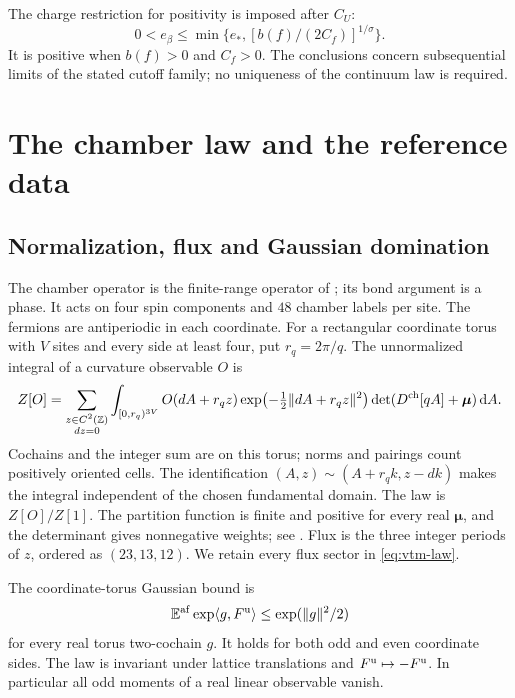 The charge restriction for positivity is imposed after $C_U$:
\begin{equation}\label{eq:constants-probe-charge}
 0<e_\beta\le
       \min\{e_*,[b(f)/(2C_f)]^{1/\sigma}\}.
\end{equation}
It is positive when $b(f)>0$ and $C_f>0$.
The conclusions concern subsequential limits of the stated
cutoff family; no uniqueness of the continuum law is required.

\section{The chamber law and the reference data}\label{sec:vtm-data}

\subsection{Normalization, flux and Gaussian domination}

The chamber operator is the finite-range operator of
\cite[\S2]{ChamberLattice}; its bond argument is a phase.
It acts on four spin components and $48$ chamber labels per
site. The fermions are antiperiodic in each coordinate.
For a rectangular coordinate torus with $V$ sites and every
side at least four, put $r_q=2\pi/q$. The unnormalized integral
of a curvature observable $O$ is
\begin{equation}\label{eq:vtm-law}
 Z[O]=\sum_{\substack{z\in C^2(\mathbb Z)\\dz=0}}
  \int_{[0,r_q)^{3V}}
 O(dA+r_qz)\exp\bigl(-\tfrac12\|dA+r_qz\|^2\bigr)
 \det(D^{\rm ch}[qA]+\boldsymbol\mu)\,\mathrm d A.
\end{equation}
Cochains and the integer sum are on this torus; norms and
pairings count positively oriented cells. The identification
$(A,z)\sim(A+r_qk,z-dk)$ makes the integral independent
of the chosen fundamental domain. The law is $Z[O]/Z[1]$.
The partition function is finite and positive for every real
$\boldsymbol\mu$, and the determinant gives nonnegative weights;
see \cite[\S2--3]{ChamberLattice}. Flux is the three integer
periods of $z$, ordered as $(23,13,12)$.
We retain every flux sector in \eqref{eq:vtm-law}.

The coordinate-torus Gaussian bound
\cite[Proposition~5.1]{ChamberLattice} is
\begin{equation}\label{eq:slab-gaussian-domination}
 \mathbb E^{\rm af}\exp\langle g,F^{\rm u}\rangle
       \le\exp(\|g\|^2/2)
\end{equation}
for every real torus two-cochain $g$.
It holds for both odd and even coordinate sides.
The law is invariant under lattice translations and
$F^{\rm u}\mapsto-F^{\rm u}$. In particular all odd
moments of a real linear observable vanish.

